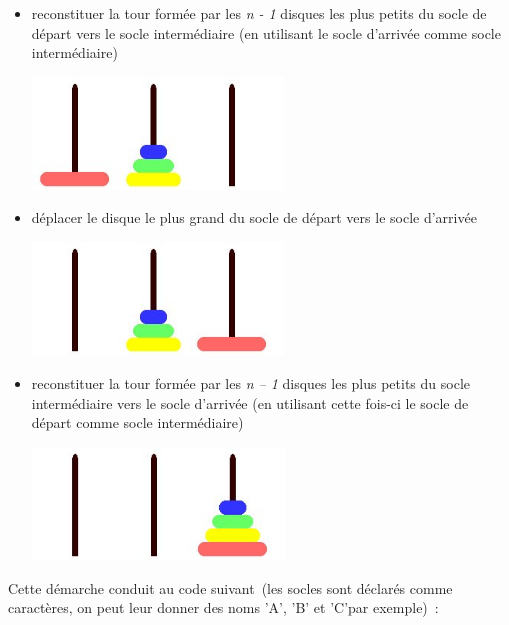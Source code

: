 		\begin{itemize}
			\item {
				reconstituer la tour formée par les \textit{n - 1} disques les plus 
				petits du socle de départ vers le socle intermédiaire (en utilisant 
				le socle d'arrivée comme socle intermédiaire)}
				
				\begin{center}
				\includegraphics[width=6.692cm,height=2.99cm]{image/a2012Logique2eme-img023.jpg}
				\end{center}
				
			\item {
				déplacer le disque le plus grand du socle de départ vers le socle d'arrivée}
				\begin{center}
				\includegraphics[width=6.668cm,height=3cm]{image/a2012Logique2eme-img024.jpg}
				\end{center}
			
			\item {
				reconstituer la tour formée par les \textit{n -- 1} disques les plus 
				petits du socle intermédiaire vers le socle d'arrivée (en utilisant 
				cette fois-ci le socle de départ comme socle intermédiaire)}
			\begin{center}
			\includegraphics[width=6.703cm,height=3cm]{image/a2012Logique2eme-img025.jpg}
			\end{center}
		\end{itemize}
		
		Cette démarche conduit au code suivant~(les socles sont déclarés comme
		caractères, on peut leur donner des noms 'A', 'B' et 'C'par exemple)~:

